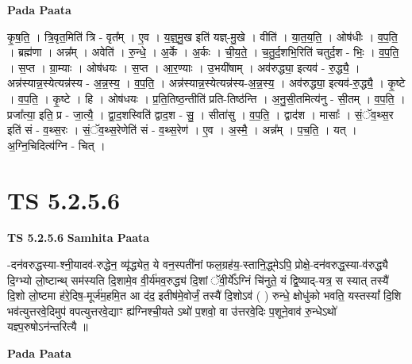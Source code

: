 \documentclass[17pt]{extarticle}
\begin{document}
\textbf{Pada Paata} \newline

कृ॒ष॒ति॒ । त्रि॒वृत॒मिति॑ त्रि - वृत᳚म् । ए॒व । य॒ज्ञ्॒मु॒ख इति॑ यज्ञ्-मु॒खे । वीति॑ । या॒त॒य॒ति॒ । ओष॑धीः । व॒प॒ति॒ । ब्रह्म॑णा । अन्न᳚म् । अवेति॑ । रु॒न्धे॒ । अ॒र्के । अ॒र्कः । ची॒य॒ते॒ । च॒तु॒र्द॒शभि॒रिति॑ चतुर्द॒श - भिः॒ । व॒प॒ति॒ । स॒प्त । ग्रा॒म्याः । ओष॑धयः । स॒प्त । आ॒र॒ण्याः । उ॒भयी॑षाम् । अव॑रुद्ध्या॒ इत्यव॑ - रु॒द्ध्यै॒ । अन्न॑स्यान्न॒स्येत्यन्न॑स्य - अ॒न्न॒स्य॒ । व॒प॒ति॒ । अन्न॑स्यान्न॒स्येत्यन्न॑स्य-अ॒न्न॒स्य॒ । अव॑रुद्ध्या॒ इत्यव॑-रु॒द्ध्यै॒ । कृ॒ष्टे । व॒प॒ति॒ । कृ॒ष्टे । हि । ओष॑धयः । प्र॒ति॒तिष्ठ॒न्तीति॑ प्रति-तिष्ठ॑न्ति । अ॒नु॒सी॒तमित्य॑नु - सी॒तम् । व॒प॒ति॒ । प्रजा᳚त्या॒ इति॒ प्र - जा॒त्यै॒ । द्वा॒द॒शस्विति॑ द्वाद॒श - सु॒ । सीता॑सु । व॒प॒ति॒ । द्वाद॑श । मासाः᳚ । सं॒ॅव॒थ्स॒र इति॑ सं - व॒थ्स॒रः । सं॒ॅव॒थ्स॒रेणेति॑ सं - व॒थ्स॒रेण॑ । ए॒व । अ॒स्मै॒ । अन्न᳚म् । प॒च॒ति॒ । यत् । अ॒ग्नि॒चिदित्य॑ग्नि - चित् ।  \newline




\section*{ TS 5.2.5.6 }

\textbf{TS 5.2.5.6 } \newline
\textbf{Samhita Paata} \newline

-दन॑वरुद्धस्या-श्नी॒यादव॑-रुद्धेन॒ व्यृ॑द्ध्येत॒ ये वन॒स्पती॑नां फल॒ग्रह॑य॒-स्तानि॒द्ध्मेऽपि॒ प्रोक्षे॒-दन॑वरुद्ध॒स्या-व॑रुद्ध्यै दि॒ग्भ्यो लो॒ष्टान्थ् सम॑स्यति दि॒शामे॒व वी॒र्य॑मव॒रुद्ध्य॑ दि॒शां ॅवी॒र्ये᳚ऽग्निं चि॑नुते॒ यं द्वि॒ष्याद्-यत्र॒ स स्यात् तस्यै॑ दि॒शो लो॒ष्टमा ह॑रे॒दिष॒-मूर्ज॑म॒हमि॒त आ द॑द॒ इतीष॑मे॒वोर्जं॒ तस्यै॑ दि॒शोऽव॑ ( ) रुन्धे॒ क्षोधु॑को भवति॒ यस्तस्यां᳚ दि॒शि भव॑त्युत्तरवे॒दिमुप॑ वपत्युत्तरवे॒द्याꣳ ह्य॑ग्निश्ची॒यते ऽथो॑ प॒शवो॒ वा उ॑त्तरवे॒दिः प॒शूने॒वाव॑ रु॒न्धेऽथो॑ यज्ञ्प॒रुषोऽन॑न्तरित्यै ॥ \newline

\textbf{Pada Paata} \newline
\end{document}
